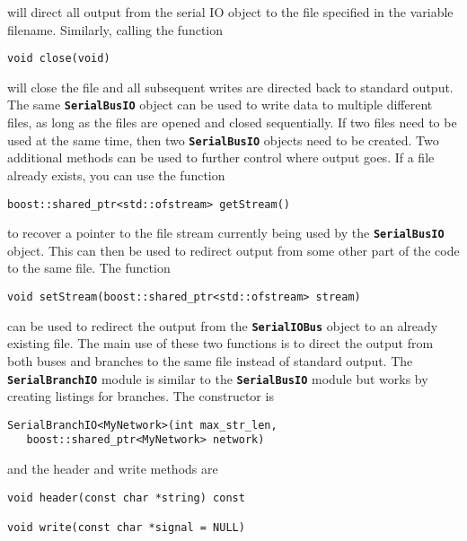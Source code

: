 will direct all output from the serial IO object to the file specified in the variable filename. Similarly, calling the function

{
\color{red}
\begin{Verbatim}[fontseries=b]
void close(void)
\end{Verbatim}
}

will close the file and all subsequent writes are directed back to standard output. The same \texttt{\textbf{SerialBusIO}} object can be used to write data to multiple different files, as long as the files are opened and closed sequentially. If two files need to be used at the same time, then two \texttt{\textbf{SerialBusIO}} objects need to be created. Two additional methods can be used to further control where output goes. If a file already exists, you can use the function

{
\color{red}
\begin{Verbatim}[fontseries=b]
boost::shared_ptr<std::ofstream> getStream()
\end{Verbatim}
}

to recover a pointer to the file stream currently being used by the \texttt{\textbf{SerialBusIO}} object. This can then be used to redirect output from some other part of the code to the same file. The function

{
\color{red}
\begin{Verbatim}[fontseries=b]
void setStream(boost::shared_ptr<std::ofstream> stream)
\end{Verbatim}
}

can be used to redirect the output from the \texttt{\textbf{SerialIOBus}} object to an already existing file. The main use of these two functions is to direct the output from both buses and branches to the same file instead of standard output.
The \texttt{\textbf{SerialBranchIO}} module is similar to the \texttt{\textbf{SerialBusIO}} module but works by creating listings for branches. The constructor is

{
\color{red}
\begin{Verbatim}[fontseries=b]
SerialBranchIO<MyNetwork>(int max_str_len,
   boost::shared_ptr<MyNetwork> network)
\end{Verbatim}
}

and the header and write methods are

{
\color{red}
\begin{Verbatim}[fontseries=b]
void header(const char *string) const

void write(const char *signal = NULL)
\end{Verbatim}
}

